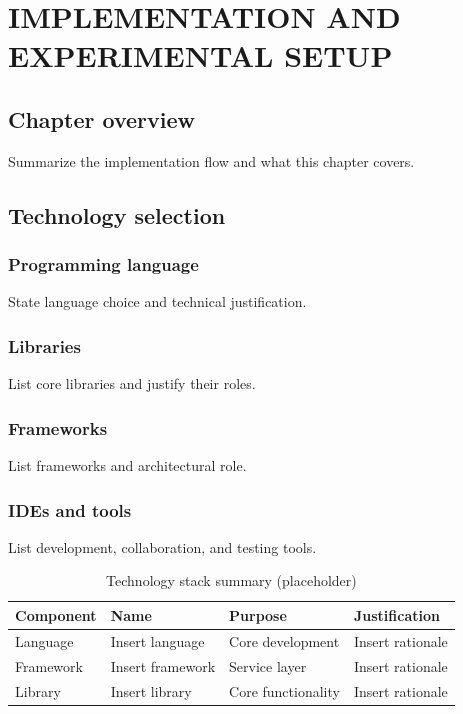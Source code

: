 \chapter{IMPLEMENTATION AND EXPERIMENTAL SETUP}
\section{Chapter overview}
Summarize the implementation flow and what this chapter covers.

\section{Technology selection}
\subsection{Programming language}
State language choice and technical justification.

\subsection{Libraries}
List core libraries and justify their roles.

\subsection{Frameworks}
List frameworks and architectural role.

\subsection{IDEs and tools}
List development, collaboration, and testing tools.

\begin{table}[H]
    \centering
    \begin{tabular}{|l|l|l|l|}
        \hline
        Component & Name & Purpose & Justification \\
        \hline
        Language & Insert language & Core development & Insert rationale \\
        Framework & Insert framework & Service layer & Insert rationale \\
        Library & Insert library & Core functionality & Insert rationale \\
        \hline
    \end{tabular}
    \caption{Technology stack summary (placeholder)}
    \label{tab:technology-stack}
\end{table}

